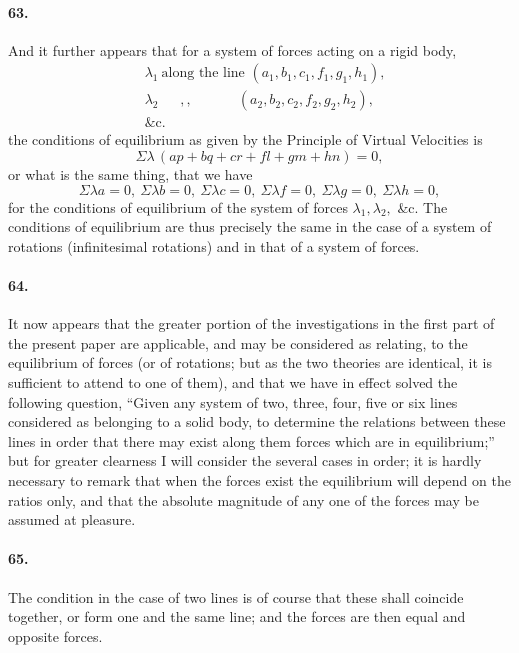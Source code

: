 \documentclass[11pt,a4paper]{article}
\begin{document}
\paragraph{63.}
And it further appears that for a system of forces acting on a rigid body,
\begin{align*}
&\lambda_1\ \text{along the line } (a_1, b_1, c_1, f_1, g_1, h_1), \\
&\lambda_2\ \quad\,\,,, \quad\quad\quad\ (a_2, b_2, c_2, f_2, g_2, h_2), \\
&\&\text{c.}
\end{align*}
the conditions of equilibrium as given by the Principle of Virtual Velocities is
\[
\Sigma\lambda\,(ap + bq + cr + fl + gm + hn) = 0,
\]
or what is the same thing, that we have
\[
\Sigma\lambda a = 0,\ \Sigma\lambda b = 0,\ \Sigma\lambda c = 0,\
 \Sigma\lambda f = 0,\ \Sigma\lambda g = 0,\ \Sigma\lambda h = 0,
\]
for the conditions of equilibrium of the system of forces $\lambda_1, \lambda_2,$ \&c. The
conditions of equilibrium are thus precisely the same in the case of a system of
rotations (infinitesimal rotations) and in that of a system of forces.

\paragraph{64.}
It now appears that the greater portion of the investigations in the first
part of the present paper are applicable, and may be considered as relating, to the
equilibrium of forces (or of rotations; but as the two theories are identical, it is
sufficient to attend to one of them), and that we have in effect solved the following
question, ``Given any system of two, three, four, five or six lines considered as belonging
to a solid body, to determine the relations between these lines in order that there
may exist along them forces which are in equilibrium;'' but for greater clearness I
will consider the several cases in order; it is hardly necessary to remark that when
the forces exist the equilibrium will depend on the ratios only, and that the absolute
magnitude of any one of the forces may be assumed at pleasure.

\paragraph{65.}
The condition in the case of two lines is of course that these shall coincide
together, or form one and the same line; and the forces are then equal and opposite
forces.
\end{document}
